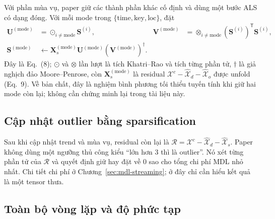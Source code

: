 Với phần mùa vụ, paper giữ các thành phần khác cố định và dùng một bước ALS có dạng đóng. Với mỗi
mode trong $\{\mathrm{time},\mathrm{key},\mathrm{loc}\}$, đặt
\begin{align}
  \mathbf{U}^{(\mathrm{mode})}
  &=\odot_{i\neq\mathrm{mode}}\mathbf{S}^{(i)},&
  \mathbf{V}^{(\mathrm{mode})}
  &=\otimes_{i\neq\mathrm{mode}}
    (\mathbf{S}^{(i)})^{\mathsf T}\mathbf{S}^{(i)},\\
  \mathbf{S}^{(\mathrm{mode})}
  &\leftarrow
    \mathbf{X}_s^{(\mathrm{mode})}
    \mathbf{U}^{(\mathrm{mode})}
    (\mathbf{V}^{(\mathrm{mode})})^{\dagger}.
  \label{eq:seasonal-update}
\end{align}
Đây là Eq.~(8); $\odot$ và $\otimes$ lần lượt là tích Khatri--Rao và tích từng phần tử,
$\dagger$ là giả nghịch đảo Moore--Penrose, còn $\mathbf{X}_s^{(\mathrm{mode})}$ là residual
$\mathcal{X}^{c}-\widehat{\mathcal{X}}_d-\widehat{\mathcal{X}}_o$ được unfold (Eq.~9). Về bản
chất, đây là nghiệm bình phương tối thiểu tuyến tính khi giữ hai mode còn lại; không cần chứng
minh lại trong tài liệu này.

\subsection{Cập nhật outlier bằng sparsification}

Sau khi cập nhật trend và mùa vụ, residual còn lại là
$\mathcal{R}=\mathcal{X}^{c}-\widehat{\mathcal{X}}_d-\widehat{\mathcal{X}}_s$. Paper không dùng
một ngưỡng thủ công kiểu ``lớn hơn 3 thì là outlier''. Nó xét từng phần tử của $\mathcal{R}$ và
quyết định giữ hay đặt về 0 sao cho tổng chi phí MDL nhỏ nhất. Chi tiết chi phí ở
Chương~\ref{sec:mdl-streaming}; ở đây chỉ cần hiểu kết quả là một tensor thưa.

\subsection{Toàn bộ vòng lặp và độ phức tạp}

